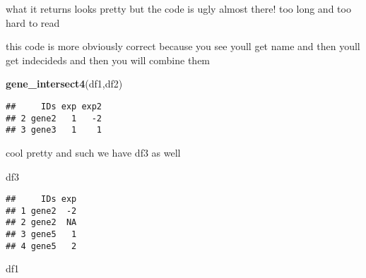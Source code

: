 \documentclass[]{article}
\newenvironment{Shaded}{\begin{snugshade}}{\end{snugshade}}
\newcommand{\KeywordTok}[1]{\textcolor[rgb]{0.13,0.29,0.53}{\textbf{#1}}}
\newcommand{\DataTypeTok}[1]{\textcolor[rgb]{0.13,0.29,0.53}{#1}}
\newcommand{\StringTok}[1]{\textcolor[rgb]{0.31,0.60,0.02}{#1}}
\newcommand{\ControlFlowTok}[1]{\textcolor[rgb]{0.13,0.29,0.53}{\textbf{#1}}}
\newcommand{\OperatorTok}[1]{\textcolor[rgb]{0.81,0.36,0.00}{\textbf{#1}}}
\newcommand{\NormalTok}[1]{#1}
\begin{document}
what it returns looks pretty but the code is ugly almost there! too long
and too hard to read

\begin{Shaded}
\end{Shaded}

this code is more obviously correct because you see youll get name and
then youll get indecideds and then you will combine them

\begin{Shaded}
\begin{Highlighting}[]
\KeywordTok{gene_intersect4}\NormalTok{(df1,df2)}
\end{Highlighting}
\end{Shaded}

\begin{verbatim}
##     IDs exp exp2
## 2 gene2   1   -2
## 3 gene3   1    1
\end{verbatim}

cool pretty and such we have df3 as well

\begin{Shaded}
\begin{Highlighting}[]
\NormalTok{df3}
\end{Highlighting}
\end{Shaded}

\begin{verbatim}
##     IDs exp
## 1 gene2  -2
## 2 gene2  NA
## 3 gene5   1
## 4 gene5   2
\end{verbatim}

\begin{Shaded}
\begin{Highlighting}[]
\NormalTok{df1}
\end{Highlighting}
\end{Shaded}
\end{document}
